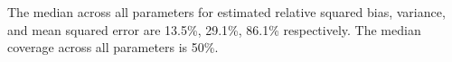 The median across all parameters for  estimated relative squared bias, variance, and mean squared error are 13.5\%, 29.1\%, 86.1\% respectively. The median coverage across all parameters is 50\%.